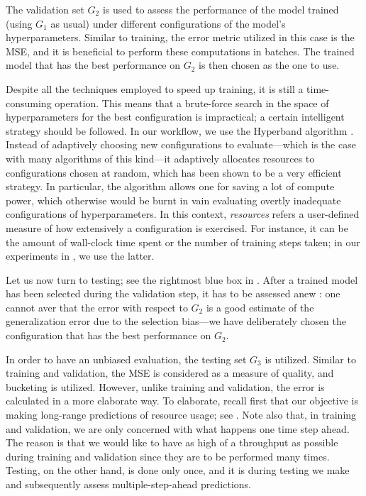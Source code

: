 The validation set $G_2$ is used to assess the performance of the model trained
(using $G_1$ as usual) under different configurations of the model's
hyperparameters. Similar to training, the error metric utilized in this case is
the \ac{MSE}, and it is beneficial to perform these computations in batches. The
trained model that has the best performance on $G_2$ is then chosen as the one
to use.

Despite all the techniques employed to speed up training, it is still a
time-consuming operation. This means that a brute-force search in the space of
hyperparameters for the best configuration is impractical; a certain intelligent
strategy should be followed. In our workflow, we use the Hyperband algorithm
\cite{li2016}. Instead of adaptively choosing new configurations to
evaluate---which is the case with many algorithms of this kind---it adaptively
allocates resources to configurations chosen at random, which has been shown to
be a very efficient strategy. In particular, the algorithm allows one for saving
a lot of compute power, which otherwise would be burnt in vain evaluating
overtly inadequate configurations of hyperparameters. In this context,
\emph{resources} refers a user-defined measure of how extensively a
configuration is exercised. For instance, it can be the amount of wall-clock
time spent or the number of training steps taken; in our experiments in
, we use the latter.

Let us now turn to testing; see the rightmost blue box in
. After a trained model has been selected during the
validation step, it has to be assessed anew \cite{hastie2013}: one cannot aver
that the error with respect to $G_2$ is a good estimate of the generalization
error due to the selection bias---we have deliberately chosen the configuration
that has the best performance on $G_2$.

In order to have an unbiased evaluation, the testing set $G_3$ is utilized.
Similar to training and validation, the \ac{MSE} is considered as a measure of
quality, and bucketing is utilized. However, unlike training and validation, the
error is calculated in a more elaborate way. To elaborate, recall first that our
objective is making long-range predictions of resource usage; see
. Note also that, in training and validation, we are only
concerned with what happens one time step ahead. The reason is that we would
like to have as high of a throughput as possible during training and validation
since they are to be performed many times. Testing, on the other hand, is done
only once, and it is during testing we make and subsequently assess
multiple-step-ahead predictions.

